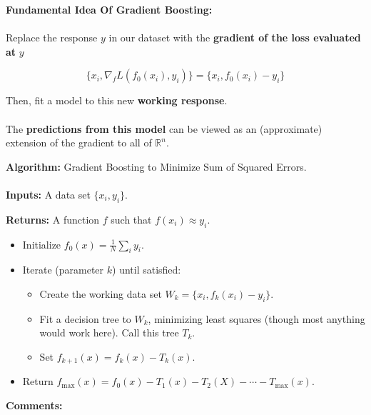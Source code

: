 %
\begin{frame}
\textbf{Fundamental Idea Of Gradient Boosting:}\\~\\

Replace the response $y$ in our dataset with the \textbf{gradient of the loss evaluated at} $y$

$$ \{x_i, \nabla_f L(f_0(x_i), y_i) \} = \{x_i, f_0(x_i) - y_i \} $$

Then, fit a model to this new \textbf{working response}.\\~\\

The \textbf{predictions from this model} can be viewed as an (approximate) extension of the gradient to all of $\mathbb{R}^n$.

\end{frame}
%
\begin{frame}
\textbf{Algorithm:} Gradient Boosting to Minimize Sum of Squared Errors.\\~\\

\textbf{Inputs:} A data set $\{ x_i, y_i \}$.

\textbf{Returns:} A function $f$ such that $f(x_i) \approx y_i$.

\begin{itemize}
  \item Initialize $f_0(x) = \frac{1}{N} \sum_i y_i$.
  \item Iterate (parameter $k$) until satisfied: \begin{itemize}
    \item Create the working data set $W_k = \{ x_i, f_k(x_i) - y_i \}$.
    \item Fit a decision tree to $W_k$, minimizing least squares (though most anything would work here).  Call this tree $T_k$.
    \item Set $f_{k+1}(x) = f_{k}(x) - T_{k}(x)$. 
  \end{itemize}
  \item Return $f_{\text{max}}(x) = f_0(x) - T_1(x) - T_2(X) - \cdots - T_{\text{max}}(x)$.
\end{itemize}
\end{frame}
%
\begin{frame}
\textbf{Comments:}

\end{frame}




